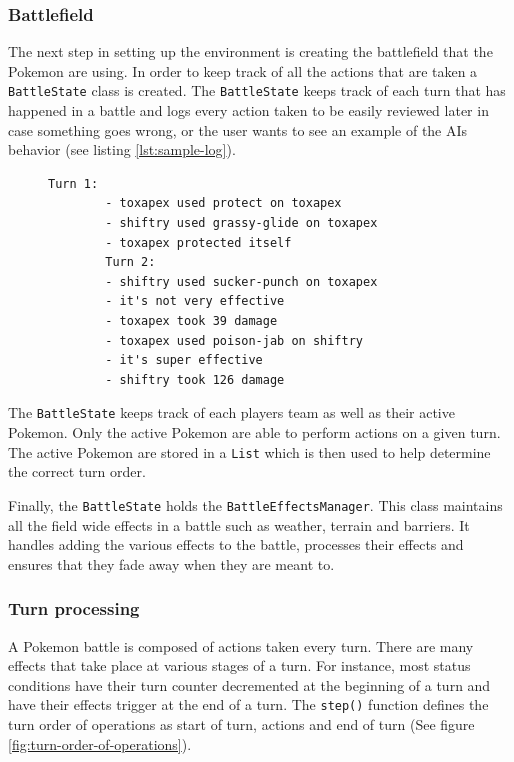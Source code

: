 \subsubsection{Battlefield}
The next step in setting up the environment is creating the battlefield that the Pokemon are using. In order to keep track
of all the actions that are taken a \lstinline|BattleState| class is created. The \lstinline|BattleState| keeps track of
each turn that has happened in a battle and logs every action taken to be easily reviewed later in case something goes wrong,
or the user wants to see an example of the AIs behavior (see listing \ref{lst:sample-log}).
\begin{figure}[H]
    \centering
    \begin{lstlisting}[caption={Sample log from an episode.},label=lst:sample-log,breaklines]
        Turn 1:
        - toxapex used protect on toxapex
        - shiftry used grassy-glide on toxapex
        - toxapex protected itself
        Turn 2:
        - shiftry used sucker-punch on toxapex
        - it's not very effective
        - toxapex took 39 damage
        - toxapex used poison-jab on shiftry
        - it's super effective
        - shiftry took 126 damage
    \end{lstlisting}
\end{figure}

The \lstinline|BattleState| keeps track of each players team as well as their active Pokemon. Only the active Pokemon are able to
perform actions on a given turn. The active Pokemon are stored in a \lstinline|List| which is then used to help determine
the correct turn order.

Finally, the \lstinline|BattleState| holds the \lstinline|BattleEffectsManager|. This class maintains all the field wide
effects in a battle such as weather, terrain and barriers. It handles adding the various effects to the battle, processes
their effects and ensures that they fade away when they are meant to.

\subsubsection{Turn processing}
A Pokemon battle is composed of actions taken every turn. There are many effects that take place at various stages of a turn.
For instance, most status conditions have their turn counter decremented at the beginning of a turn and have their effects trigger at
the end of a turn. The \lstinline|step()| function defines the turn order of operations as start of turn, actions and end
of turn (See figure \ref{fig:turn-order-of-operations}).

